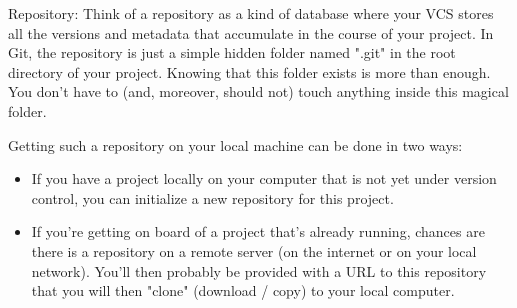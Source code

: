 \documentclass{article}
\begin{document}
\begin{definition}Repository:
\newline\newline
Think of a repository as a kind of database where your VCS stores all the versions and metadata that accumulate in the course of your project. In Git, the repository is just a simple hidden folder named ".git" in the root directory of your project. Knowing that this folder exists is more than enough. You don't have to (and, moreover, should not) touch anything inside this magical folder.
\end{definition}

Getting such a repository on your local machine can be done in two ways:

\begin{itemize}
    \item If you have a project locally on your computer that is not yet under version control, you can initialize a new repository for this project.
    \item  If you're getting on board of a project that's already running, chances are there is a repository on a remote server (on the internet or on your local network). You'll then probably be provided with a URL to this repository that you will then "clone" (download / copy) to your local computer.
\end{itemize}
\end{document}
